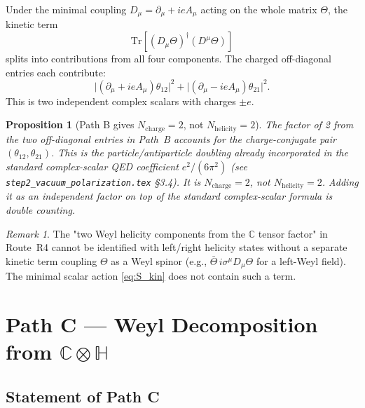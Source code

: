 \documentclass[12pt,a4paper]{article}
\newtheorem{proposition}[theorem]{Proposition}
\theoremstyle{remark}
\newtheorem{remark}[theorem]{Remark}
\newcommand{\Nhelicity}{N_{\mathrm{helicity}}}
\begin{document}
Under the minimal coupling $D_\mu = \partial_\mu + ieA_\mu$ acting on
the whole matrix $\Theta$, the kinetic term
\begin{equation}
  \mathrm{Tr}\!\left[(D_\mu\Theta)^\dagger(D^\mu\Theta)\right]
  \label{eq:Tr_kin}
\end{equation}
splits into contributions from all four components.  The charged
off-diagonal entries each contribute:
\begin{equation}
  \bigl|({\partial}_\mu + ieA_\mu)\theta_{12}\bigr|^2
  + \bigl|({\partial}_\mu - ieA_\mu)\theta_{21}\bigr|^2.
  \label{eq:offdiag}
\end{equation}
This is two independent complex scalars with charges $\pm e$.

\begin{proposition}[Path B gives $N_{\mathrm{charge}} = 2$, not $\Nhelicity = 2$]
\label{prop:pathB}
The factor of 2 from the two off-diagonal entries in Path~B accounts for
the charge-conjugate pair $(\theta_{12}, \theta_{21})$.
This is the particle/antiparticle doubling already incorporated in the
standard complex-scalar QED coefficient $e^2/(6\pi^2)$
(see \texttt{step2\_vacuum\_polarization.tex} §3.4).
It is $N_{\mathrm{charge}} = 2$, not $\Nhelicity = 2$.
Adding it as an independent factor on top of the standard complex-scalar
formula is double counting.
\end{proposition}

\begin{remark}
The "two Weyl helicity components from the $\mathbb{C}$ tensor factor"
in Route~R4 cannot be identified with left/right helicity states without
a separate kinetic term coupling $\Theta$ as a Weyl spinor (e.g.,
$\bar\Theta\, i\sigma^\mu D_\mu \Theta$ for a left-Weyl field).
The minimal scalar action \eqref{eq:S_kin} does not contain such a term.
\end{remark}

\section{Path C — Weyl Decomposition from $\mathbb{C}\otimes\mathbb{H}$}
\label{sec:pathC}

\subsection{Statement of Path C}
\end{document}
